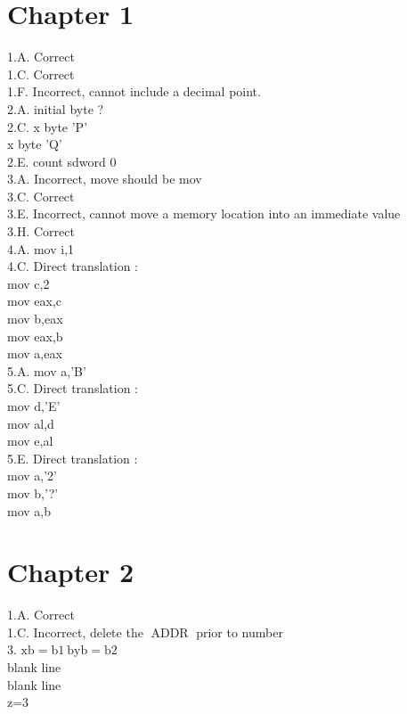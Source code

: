 \documentclass[10pt]{article}
\begin{document}
\section*{Chapter 1}
1.A. Correct\\
1.C. Correct\\
1.F. Incorrect, cannot include a decimal point.\\
2.A. initial byte ?\\
2.C. x byte 'P'\\
x byte 'Q'\\
2.E. count sdword 0\\
3.A. Incorrect, move should be mov\\
3.C. Correct\\
3.E. Incorrect, cannot move a memory location into an immediate value\\
3.H. Correct\\
4.A. mov i,1\\
4.C. Direct translation :\\
mov c,2\\
mov eax,c\\
mov b,eax\\
mov eax,b\\
mov a,eax\\
5.A. mov a,'B'\\
5.C. Direct translation :\\
mov d,'E'\\
mov al,d\\
mov e,al\\
5.E. Direct translation :\\
mov a,'2'\\
mov b,'?'\\
mov a,b

\section*{Chapter 2}
1.A. Correct\\
1.C. Incorrect, delete the $\operatorname{ADDR}$ prior to number\\
3. $\mathrm{xb}=\mathrm{b} 1 \mathrm{~b} \mathrm{yb}=\mathrm{b} 2$\\
blank line\\
blank line\\
z=3
\end{document}
